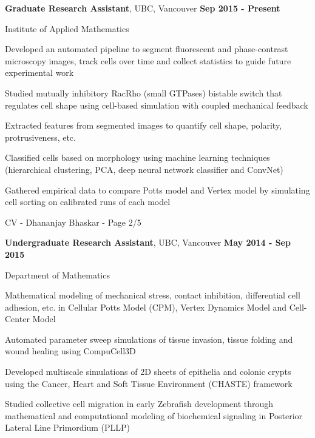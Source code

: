 \documentclass[margin,line]{res}
\newenvironment{list1}{
  \begin{list}{\ding{113}}{
      \setlength{\itemsep}{0in}
      \setlength{\parsep}{0in} \setlength{\parskip}{0in}
      \setlength{\topsep}{0in} \setlength{\partopsep}{0in} 
      \setlength{\leftmargin}{0.17in}}}{\end{list}}
\newenvironment{list3}{
  \begin{list}{\textopenbullet}{
      \setlength{\itemsep}{0in}
      \setlength{\parsep}{0in} \setlength{\parskip}{0in}
      \setlength{\topsep}{0in} \setlength{\partopsep}{0in} 
      \setlength{\leftmargin}{0.1in}}}{\end{list}}
\begin{document}
\begin{resume}
{\bf Graduate Research Assistant}, UBC, Vancouver \hfill {\bf Sep 2015 - Present}\\
\vspace*{-.2cm}
\begin{list1}
\item[] Institute of Applied Mathematics
\vspace*{.2cm}
\begin{list3}
\setlength\itemsep{0.5em}
\item Developed an automated pipeline to segment fluorescent and phase-contrast microscopy images, track cells over time and collect statistics to guide future experimental work
\item Studied mutually inhibitory Rac{\textendash}Rho (small GTPases) bistable switch that regulates cell shape using cell-based simulation with coupled mechanical feedback
\item Extracted features from segmented images to quantify cell shape, polarity, protrusiveness, etc.
\item Classified cells based on morphology using machine learning techniques (hierarchical clustering, PCA, deep neural network classifier and ConvNet)
\item Gathered empirical data to compare Potts model and Vertex model by simulating cell sorting on calibrated runs of each model
\end{list3}
\end{list1}

\newpage
\begin{flushright}
CV - Dhananjay Bhaskar - Page 2/5
\end{flushright}
\vspace*{.2cm}

{\bf Undergraduate Research Assistant}, UBC, Vancouver \hfill {\bf May 2014 - Sep 2015}\\
\vspace*{-.2cm}
\begin{list1}
\item[] Department of Mathematics
\vspace*{.2cm}
\begin{list3}
\setlength\itemsep{0.5em}
\item Mathematical modeling of mechanical stress, contact inhibition, differential cell adhesion, etc. in Cellular Potts Model (CPM), Vertex Dynamics Model and Cell-Center Model
\item Automated parameter sweep simulations of tissue invasion, tissue folding and wound healing using CompuCell3D
\item Developed multiscale simulations of 2{\textendash}D sheets of epithelia and colonic crypts using the Cancer, Heart and Soft Tissue Environment (CHASTE) framework
\item Studied collective cell migration in early Zebrafish development through mathematical and computational modeling of biochemical signaling in Posterior Lateral Line Primordium (PLLP)
\end{list3}
\end{list1}
\vspace*{.2cm}


\end{resume}
\end{document}

